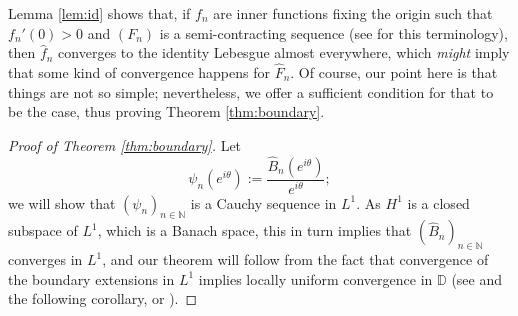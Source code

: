 \documentclass[a4paper,11pt]{article}
\theoremstyle{plain}
\theoremstyle{definition}
\theoremstyle{definition}
\def\D{\mathbb{D}}
\begin{document}
Lemma \ref{lem:id} shows that, if $f_n$ are inner functions fixing the origin such that $f_n'(0) > 0$ and $(F_n)$ is a semi-contracting sequence (see \cite[Theorem 7.2]{BEFRS22} for this terminology), then $\hat{f}_n$ converges to the identity Lebesgue almost everywhere, which \textit{might} imply that some kind of convergence happens for $\hat{F}_n$. Of course, our point here is that things are not so simple; nevertheless, we offer a sufficient condition for that to be the case, thus proving Theorem \ref{thm:boundary}.
\begin{proof}[Proof of Theorem \ref{thm:boundary}]
Let
\[ \psi_n(e^{i\theta}) := \frac{\hat{B}_n(e^{i\theta})}{e^{i\theta}}; \]
we will show that $(\psi_n)_{n\in\mathbb{N}}$ is a Cauchy sequence in $L^1$. As $H^1$ is a closed subspace of $L^1$, which is a Banach space, this in turn implies that $(\hat{B}_n)_{n\in\mathbb{N}}$ converges in $L^1$, and our theorem will follow from the fact that convergence of the boundary extensions in $L^1$ implies locally uniform convergence in $\D$ (see \cite[Theorem 3.3]{Dur70} and the following corollary, or \cite[Remark 17.8(c) and Theorem 17.11]{Rud87}).


\end{proof}
\end{document}
